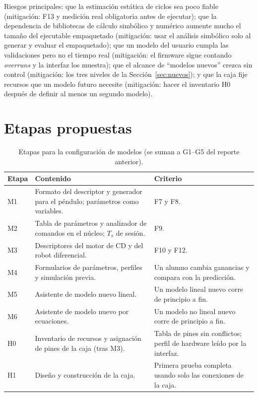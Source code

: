 \documentclass[12pt,letterpaper]{article}
\begin{document}
Riesgos principales: que la estimación estática de ciclos sea poco fiable (mitigación: F13 y medición real obligatoria antes de ejecutar); que la dependencia de bibliotecas de cálculo simbólico y numérico aumente mucho el tamaño del ejecutable empaquetado (mitigación: usar el análisis simbólico solo al generar y evaluar el empaquetado); que un modelo del usuario cumpla las validaciones pero no el tiempo real (mitigación: el firmware sigue contando \textit{overruns} y la interfaz los muestra); que el alcance de ``modelos nuevos'' crezca sin control (mitigación: los tres niveles de la Sección~\ref{sec:nuevos}); y que la caja fije recursos que un modelo futuro necesite (mitigación: hacer el inventario H0 después de definir al menos un segundo modelo).

\section{Etapas propuestas}

\begin{table}[!htbp]
\centering
\caption{Etapas para la configuración de modelos (se suman a G1--G5 del reporte anterior).}
\label{tab:etapas}
\begin{tabularx}{\textwidth}{>{\raggedright\arraybackslash}p{1.1cm}Y>{\raggedright\arraybackslash}p{4.2cm}}
\toprule
\textbf{Etapa} & \textbf{Contenido} & \textbf{Criterio} \\
\midrule
M1 & Formato del descriptor y generador para el péndulo; parámetros como variables. & F7 y F8. \\
M2 & Tabla de parámetros y analizador de comandos en el núcleo; $T_s$ de sesión. & F9. \\
M3 & Descriptores del motor de CD y del robot diferencial. & F10 y F12. \\
M4 & Formularios de parámetros, perfiles y simulación previa. & Un alumno cambia ganancias y compara con la predicción. \\
M5 & Asistente de modelo nuevo lineal. & Un modelo lineal nuevo corre de principio a fin. \\
M6 & Asistente de modelo nuevo por ecuaciones. & Un modelo no lineal nuevo corre de principio a fin. \\
H0 & Inventario de recursos y asignación de pines de la caja (tras M3). & Tabla de pines sin conflictos; perfil de hardware leído por la interfaz. \\
H1 & Diseño y construcción de la caja. & Primera prueba completa usando solo las conexiones de la caja. \\
\bottomrule
\end{tabularx}
\end{table}
\end{document}
